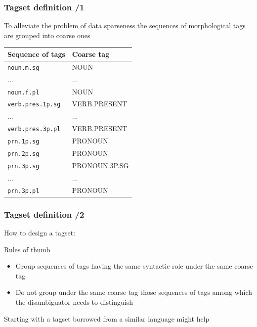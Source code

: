 \documentclass{beamer} %
\begin{document}
\begin{frame}
  \frametitle{Tagset definition /1}

  To alleviate the problem of data sparseness the sequences of
  morphological tags are grouped into coarse ones

  \begin{exampleblock}{}
    \begin{center}
    \begin{tabular}{ll}
      \textbf{Sequence of tags} & \textbf{Coarse tag}\\
      \hline
      \texttt{noun.m.sg} & NOUN\\
      ... & ...\\
      \texttt{noun.f.pl} & NOUN\\
      \texttt{verb.pres.1p.sg} & VERB.PRESENT \\
      ... & ...\\
      \texttt{verb.pres.3p.pl} & VERB.PRESENT \\
      \texttt{prn.1p.sg} & PRONOUN \\
      \texttt{prn.2p.sg} & PRONOUN \\
      \texttt{prn.3p.sg} & PRONOUN.3P.SG \\
      ... & ...\\
      \texttt{prn.3p.pl} & PRONOUN \\
    \end{tabular}
  \end{center}
  \end{exampleblock}
\end{frame}

\begin{frame}
  \frametitle{Tagset definition /2}

  How to design a tagset:

  \begin{block}{Rules of thumb}
    \begin{itemize}
    \item Group sequences of tags having the same syntactic role under
      the same coarse tag
    \item Do not group under the same coarse tag those sequences of
      tags among which the disambiguator needs to distinguish
    \end{itemize}
  \end{block}

  Starting with a tagset borrowed from a similar language might help
\end{frame}
\end{document}

